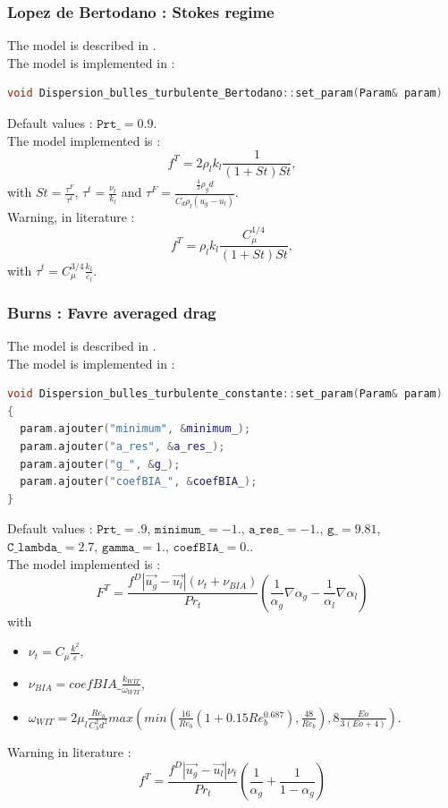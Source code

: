 %
\subsubsection{Lopez de Bertodano : Stokes regime}
The model is described in \cite{LOPEZDEBERTODANO199865}.\\
The model is implemented in :
\begin{lstlisting}[language=c++]
void Dispersion_bulles_turbulente_Bertodano::set_param(Param& param)
\end{lstlisting}
Default values : $\texttt{Prt\_} = 0.9$.\\
The model implemented is :
\begin{equation}
   f^{T}=2\rho_lk_l\frac{1}{(1+St)St},
\end{equation}
with $St=\frac{\tau^F}{\tau^t}$, $\tau^t=\frac{\nu_t}{k_l}$ and $\tau^F=\frac{\frac{4}{3}\rho_g d}{C_d\rho_l(u_g-u_l)}$.\\
{\color{red} Warning}, in literature :
\begin{equation}
   f^{T}=\rho_lk_l\frac{C_{\mu}^{1/4}}{(1+St)St},
\end{equation}
with $\tau^t=C_{\mu}^{3/4}\frac{k_l}{\varepsilon_l}$.

%
\subsubsection{Burns : Favre averaged drag}
The model is described in \cite{burns2004favre}.\\
The model is implemented in :
\begin{lstlisting}[language=c++]
void Dispersion_bulles_turbulente_constante::set_param(Param& param)
{
  param.ajouter("minimum", &minimum_);
  param.ajouter("a_res", &a_res_);
  param.ajouter("g_", &g_);
  param.ajouter("coefBIA_", &coefBIA_);
}
\end{lstlisting}
Default values :  $\texttt{Prt\_} = .9 $, $\texttt{minimum\_} = -1.$, $\texttt{a\_res\_} = -1.$, $\texttt{g\_} = 9.81$, $\texttt{C\_lambda\_} = 2.7$, $\texttt{gamma\_} = 1.$, $\texttt{coefBIA\_} = 0.$.\\
The model implemented is :
\begin{equation}
   F^{T}=\frac{f^D|\vec{u_g}-\vec{u_l}|(\nu_t+\nu_{BIA})}{Pr_t}(\frac{1}{\alpha_g}\nabla \alpha_g-\frac{1}{\alpha_l}\nabla \alpha_l)
\end{equation}
with
\begin{itemize}
    \item[\small \textcolor{blue}{\ding{109}}]$\nu_t=C_\mu\frac{k^2}{\varepsilon}$,
    \item[\small \textcolor{blue}{\ding{109}}]$\nu_{BIA}=coefBIA\_ \frac{k_{WIT}}{\omega_{WIT}}$,
    \item[\small \textcolor{blue}{\ding{109}}]$\omega_{WIT}=2\mu_l \frac{Re_b}{C_{\lambda}^2 d^2}max(min(\frac{16}{Re_b}(1+0.15Re_b^{0.687}),\frac{48}{Re_b}),8\frac{Eo}{3(Eo+4)})$.
\end{itemize}
{\color{red} Warning} in literature :
\begin{equation}
   f^{T}=\frac{f^D|\vec{u_g}-\vec{u_l}|\nu_t}{Pr_t}(\frac{1}{\alpha_g}+\frac{1}{1-\alpha_g})
\end{equation}

